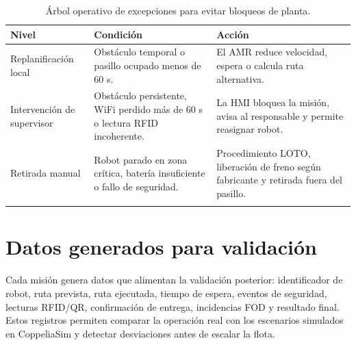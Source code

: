 \begin{longtable}{P{0.24\textwidth}P{0.36\textwidth}P{0.30\textwidth}}
\toprule
Nivel & Condición & Acción\\
\midrule
\endhead
Replanificación local & Obstáculo temporal o pasillo ocupado menos de 60 s. & El AMR reduce velocidad, espera o calcula ruta alternativa.\\
Intervención de supervisor & Obstáculo persistente, WiFi perdido más de 60 s o lectura RFID incoherente. & La HMI bloquea la misión, avisa al responsable y permite reasignar robot.\\
Retirada manual & Robot parado en zona crítica, batería insuficiente o fallo de seguridad. & Procedimiento LOTO, liberación de freno según fabricante y retirada fuera del pasillo.\\
\bottomrule
\caption{Árbol operativo de excepciones para evitar bloqueos de planta.}
\label{tab:excepciones-operativas}
\end{longtable}

\section{Datos generados para validación}

Cada misión genera datos que alimentan la validación posterior: identificador de robot, ruta prevista, ruta ejecutada, tiempo de espera, eventos de seguridad, lecturas RFID/QR, confirmación de entrega, incidencias FOD y resultado final. Estos registros permiten comparar la operación real con los escenarios simulados en CoppeliaSim y detectar desviaciones antes de escalar la flota.
